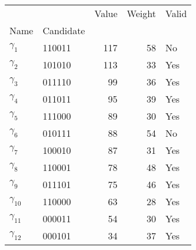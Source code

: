 \begin{tabular}{llrrl}
\hline
              &        &                                    Value &                                   Weight &                                    Valid \\
Name & Candidate &                                          &                                          &                                          \\
\midrule
$\gamma_{1}$ & 110011 &                                      117 &                                       58 &                                       No \\
$\gamma_{2}$ & 101010 &                                      113 &                                       33 &                                      Yes \\
$\gamma_{3}$ & 011110 &                                       99 &                                       36 &                                      Yes \\
$\gamma_{4}$ & 011011 &                                       95 &                                       39 &                                      Yes \\
$\gamma_{5}$ & 111000 &                                       89 &                                       30 &                                      Yes \\
$\gamma_{6}$ & 010111 &                                       88 &                                       54 &                                       No \\
$\gamma_{7}$ & 100010 &                                       87 &                                       31 &                                      Yes \\
$\gamma_{8}$ & 110001 &                                       78 &                                       48 &                                      Yes \\
$\gamma_{9}$ & 011101 &                                       75 &                                       46 &                                      Yes \\
$\gamma_{10}$ & 110000 &                                       63 &                                       28 &                                      Yes \\
$\gamma_{11}$ & 000011 &                                       54 &                                       30 &                                      Yes \\
$\gamma_{12}$ & 000101 &                                       34 &                                       37 &                                      Yes \\
\hline
\end{tabular}
